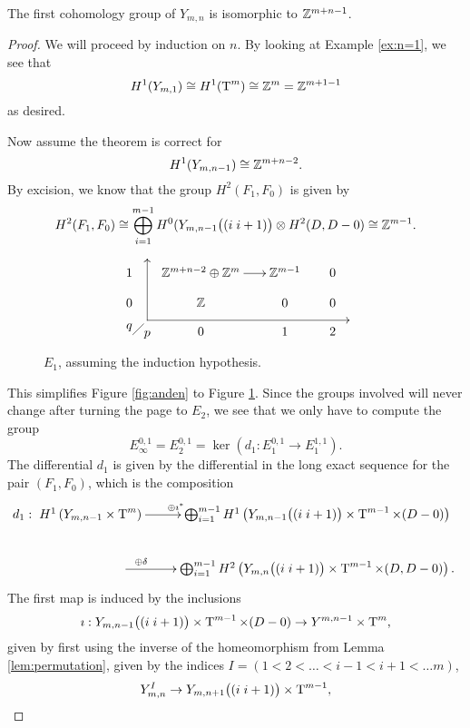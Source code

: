 \begin{theorem}
  \label{thm:forste}
  The first cohomology group of $Y_{m,n}$ is isomorphic to $\mathbb{Z}^{m+n-1}$.
\end{theorem}
\begin{proof}
  We will proceed by induction on $n$. By looking at Example
  \ref{ex:n=1}, we see that
  \[ H^1(Y_{m,1}) \cong H^1(\operatorname{T}^{m}) \cong \mathbb{Z}^m = \mathbb{Z}^{m+1-1} \]
  as desired.

  Now assume the theorem is correct for 
  \[ H^1(Y_{m,n-1}) \cong \mathbb{Z}^{m+n-2}. \]
  By excision, we know that the group $H^2(F_1,F_0)$ is given by
  \[ H^2(F_1,F_0) \cong \bigoplus_{i=1}^{m-1} H^0(Y_{m,n-1}\big((i\;
  i+1)\big) \otimes H^2(D,D-0) \cong \mathbb{Z}^{m-1}. \]
  \begin{figure}[ht]
    \[ \xy
    (5,4); (5,-13); **\dir{-}; (5,4); *\dir{>};
    (5,-13); (61,-13); **\dir{-}; *\dir{<};
    (0,-15)*{q}; (5,-17)*{p};
    (1,-17); (4,-14); **\dir{-};
    (0,0)\xymatrix@R=1em@C=1.7em{
      1 & \Z^{m+n-2}\oplus\Z^m \ar[r]& \Z^{m-1} & 0 \\
      0 & \Z & 0 & 0 \\
      & 0 & 1 & 2
    } \endxy \]
    \caption{$E_1$, assuming the induction hypothesis.}
    \label{fig:tredje}
  \end{figure}
  This simplifies Figure \ref{fig:anden} to Figure
  \ref{fig:tredje}. Since the groups involved will never change after
  turning the page to $E_2$, we see that we only have to compute the
  group
  \[ E_\infty^{0,1} = E_2^{0,1} = \ker \left( d_1 : E_1^{0,1} \to
    E_1^{1,1} \right). \]
  The differential $d_1$ is given by the differential in the long
  exact sequence for the pair $(F_1,F_0)$, which is the composition
  \[ d_1 : \xymatrix{ H^1\left(Y_{m,n-1}\times \T^m\right)
    \ar[r]^<<<<<<<<<{\oplus\imath^*}  & \bigoplus_{i=1}^{m-1}
    H^1\left(Y_{m,n-1}\big((i\; i+1)\big)\times \T^{m-1} \times
      (D-0)\right)  \\
    \hspace{5em}\ar[r]^<<<<<{\oplus\delta} & \bigoplus_{i=1}^{m-1}
    H^2\left(Y_{m,n}\big((i\; i+1)\big)\times \T^{m-1} \times
      (D,D-0)\right).}\] 
  The first map is induced by the inclusions
  \[ \imath : Y_{m,n-1}\big((i\; i+1)\big) \times \operatorname{T}^{m-1} \times (D-0)
  \to Y^{m,n-1}\times \operatorname{T}^m, \] 
  given by first using the inverse of the homeomorphism from Lemma
  \ref{lem:permutation}, given by the indices $I = (1 < 2 < \dots <
  i-1 < i+1 < \dots m)$,
  \[ Y_{m,n}^I \to Y_{m,n+1}\big((i \; i+1)\big) \times \operatorname{T}^{m-1}, \]

\end{proof}
